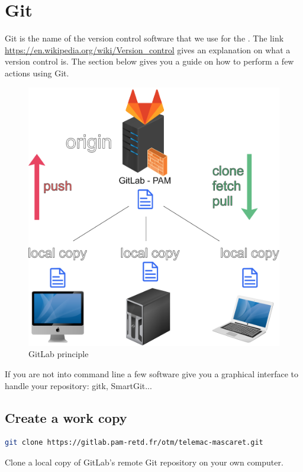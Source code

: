 \chapter{Git}
%
Git is the name of the version control software that we use for the
\telemacsystem. The link \url{https://en.wikipedia.org/wiki/Version_control}
gives an explanation on what a version control is. The section below gives
you a guide on how to perform a few actions using Git.
%
\begin{figure}[H]
    \centering
    \includegraphics[scale=0.5]{graphics/gitlab-image.png}
    \caption{GitLab principle}
    \label{fig:svn-struct}
\end{figure}
If you are not into command line a few software give you a graphical interface
to handle your repository: gitk, SmartGit...
%
%
\section{Create a work copy}
%
%
\begin{lstlisting}[language=bash]
git clone https://gitlab.pam-retd.fr/otm/telemac-mascaret.git
\end{lstlisting}
Clone a local copy of GitLab's remote Git repository on your own computer.\\

